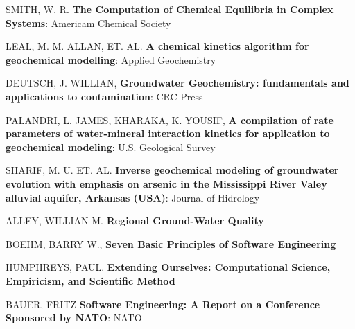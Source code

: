 \documentclass[ppgc,mestrado,english]{iiufrgs}
\begin{document}
\begin{thebibliography}{este-parametro-nao-eh-usado-pelo-estilo-ABNT}
 SMITH, W. R. 
\textbf{The Computation of Chemical Equilibria in Complex Systems}: Americam Chemical Society

 LEAL, M. M. ALLAN, ET. AL.
\textbf{A chemical kinetics algorithm for geochemical modelling}: Applied Geochemistry

 DEUTSCH, J. WILLIAN,
\textbf{Groundwater Geochemistry: fundamentals and applications to contamination}: CRC Press

 PALANDRI, L. JAMES, KHARAKA, K. YOUSIF,
\textbf{A compilation of rate parameters of water-mineral interaction kinetics for application to geochemical modeling}: U.S. Geological Survey

 SHARIF, M. U. ET. AL. 
\textbf{Inverse geochemical modeling of groundwater evolution with emphasis on arsenic in the Mississippi River Valey alluvial aquifer, Arkansas (USA)}: Journal of Hidrology

 ALLEY, WILLIAN M.
\textbf{Regional Ground-Water Quality}

 BOEHM, BARRY W.,
\textbf{Seven Basic Principles of Software Engineering}

 HUMPHREYS, PAUL.
\textbf{Extending Ourselves: Computational Science, Empiricism, and Scientific Method}

 BAUER, FRITZ
\textbf{Software Engineering: A Report on a Conference Sponsored by NATO}: NATO

\end{thebibliography}
\end{document}
